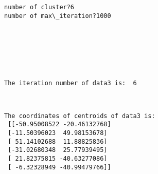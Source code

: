 \documentclass[11pt]{article}
\begin{document}
    \begin{Verbatim}[commandchars=\\\{\}]
number of cluster?6
number of max\_iteration?1000
    \end{Verbatim}

    \begin{center}
    \end{center}
    { \hspace*{\fill} \\}
    
    \begin{Verbatim}[commandchars=\\\{\}]




The iteration number of data3 is:  6
    \end{Verbatim}

    \begin{center}
    \end{center}
    { \hspace*{\fill} \\}
    
    \begin{Verbatim}[commandchars=\\\{\}]
The coordinates of centroids of data3 is:
 [[-50.95008522 -20.46132768]
 [-11.50396023  49.98153678]
 [ 51.14102688  11.88825836]
 [-31.02680348  25.77939495]
 [ 21.82375815 -40.63277086]
 [ -6.32328949 -40.99479766]]
    \end{Verbatim}
\end{document}
